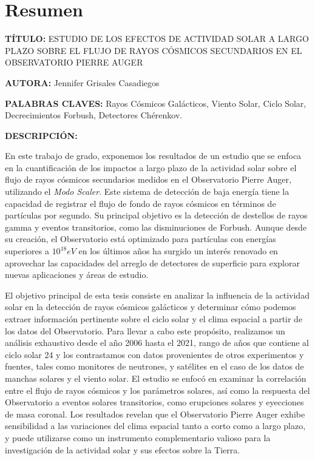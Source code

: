 \newpage
\chapter*{Resumen}
\label{sec:resum}
\footnotesize{
\noindent\textbf{TÍTULO:}  ESTUDIO DE LOS EFECTOS DE ACTIVIDAD SOLAR A LARGO PLAZO
SOBRE EL FLUJO DE RAYOS CÓSMICOS SECUNDARIOS EN EL OBSERVATORIO PIERRE AUGER

\noindent\textbf{AUTORA:} Jennifer Grisales Casadiegos

\noindent\textbf{PALABRAS CLAVES: } Rayos Cósmicos Galácticos, Viento Solar, Ciclo Solar, Decrecimientos Forbush, Detectores Chérenkov.

\noindent \textbf{DESCRIPCIÓN: }

En este trabajo de grado, exponemos los resultados de un estudio que se enfoca en la cuantificación de los impactos a largo plazo de la actividad solar sobre el flujo de rayos cósmicos secundarios medidos en el Observatorio Pierre Auger, utilizando el \textit{Modo Scaler}. Este sistema de detección de baja energía tiene la capacidad de registrar el flujo de fondo de rayos cósmicos en términos de partículas por segundo. Su principal objetivo es la detección de destellos de rayos gamma y eventos transitorios, como las disminuciones de Forbush. Aunque desde su creación, el Observatorio está optimizado para partículas con energías superiores a $10^{18}eV$ en los últimos años ha surgido un interés renovado en aprovechar las capacidades del arreglo de detectores de superficie para explorar nuevas aplicaciones y áreas de estudio.

El objetivo principal de esta tesis consiste en analizar la influencia de la actividad solar en la detección de rayos cósmicos galácticos y determinar cómo podemos extraer información pertinente sobre el ciclo solar y el clima espacial a partir de los datos del Observatorio. Para llevar a cabo este propósito, realizamos un análisis exhaustivo desde el año 2006 hasta el 2021, rango de años que contiene al ciclo solar 24 y los contrastamos con datos provenientes de otros experimentos y fuentes, tales como monitores de neutrones, y satélites en el caso de los datos de manchas solares y el viento solar. El estudio se enfocó en examinar la correlación entre el flujo de rayos cósmicos y los parámetros solares, así como la respuesta del Observatorio a eventos solares transitorios, como erupciones solares y eyecciones de masa coronal. Los resultados revelan que el Observatorio Pierre Auger exhibe sensibilidad a las variaciones del clima espacial tanto a corto como a largo plazo, y puede utilizarse como un instrumento complementario valioso para la investigación de la actividad solar y sus efectos sobre la Tierra.
}\normalsize
\clearpage
